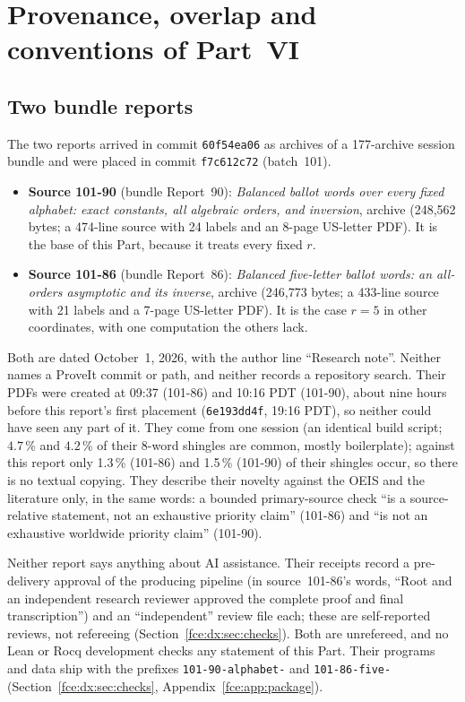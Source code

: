 \documentclass[11pt,a4paper]{article}
\numberwithin{equation}{section}
\theoremstyle{definition}\newtheorem{definition}[theorem]{Definition}
\theoremstyle{remark}\newtheorem{remark}[theorem]{Remark}
\begin{document}
\section{Provenance, overlap and conventions of Part~VI}\label{fce:dx:sec:intro}
\subsection{Two bundle reports}\label{fce:dx:sec:source}
The two reports arrived in commit \texttt{60f54ea06} as archives of a
177-archive session bundle and were placed in commit \texttt{f7c612c72}
(batch~101).
\begin{itemize}
\item \textbf{Source 101-90} (bundle Report~90): \emph{Balanced ballot words
over every fixed alphabet: exact constants, all algebraic orders, and
inversion}, archive 
(248{,}562 bytes; a 474-line source with 24 labels and an 8-page US-letter
PDF). It is the base of this Part, because it treats every fixed $r$.
\item \textbf{Source 101-86} (bundle Report~86): \emph{Balanced five-letter
ballot words: an all-orders asymptotic and its inverse}, archive
 (246{,}773 bytes; a 433-line
source with 21 labels and a 7-page US-letter PDF). It is the case $r=5$ in
other coordinates, with one computation the others lack.
\end{itemize}
Both are dated October~1, 2026, with the author line ``Research note''.
Neither names a ProveIt commit or path, and neither records a repository
search. Their PDFs were created at 09:37 (101-86) and 10:16 PDT (101-90),
about nine hours
before this report's first placement (\texttt{6e193dd4f}, 19:16 PDT), so
neither could have seen any part of it. They come from one session (an
identical build script; $4.7$\,\% and $4.2$\,\% of their 8-word shingles are
common, mostly boilerplate); against this report only 1.3\,\% (101-86) and 1.5\,\%
(101-90) of their shingles occur, so there is no textual copying. They
describe their novelty against the OEIS and the literature only, in the same
words: a bounded primary-source check ``is a source-relative statement, not
an exhaustive priority claim'' (101-86) and ``is not an exhaustive worldwide
priority claim'' (101-90).

Neither report says anything about AI assistance. Their receipts record a
pre-delivery approval of the producing pipeline (in source~101-86's words,
``Root and an independent research reviewer approved the complete proof and
final transcription'') and
an ``independent'' review file each; these are self-reported reviews, not
refereeing (Section~\ref{fce:dx:sec:checks}). Both are unrefereed, and no Lean
or Rocq development checks any statement of this Part. Their programs and
data ship with the prefixes \texttt{101-90-alphabet-} and
\texttt{101-86-five-} (Section~\ref{fce:dx:sec:checks},
Appendix~\ref{fce:app:package}).
\end{document}
